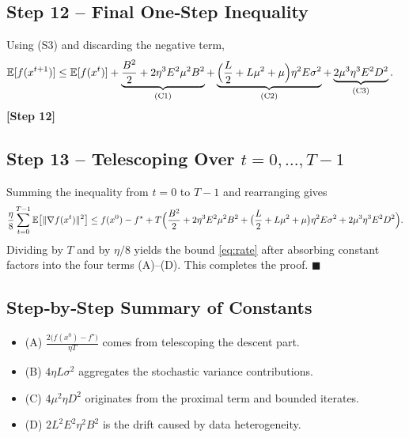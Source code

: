 \documentclass{article}
\begin{document}
\subsection*{Step 12 – Final One‑Step Inequality}
Using (S3) and discarding the negative term,
\begin{align}
\mathbb{E}[f(x^{t+1})]
&\le \mathbb{E}[f(x^{t})]
   +\underbrace{\frac{B^{2}}{2}+2\eta^{3}E^{2}\mu^{2}B^{2}}_{\text{(C1)}}
   +\underbrace{\Bigl(\frac{L}{2}+L\mu^{2}+\mu\Bigr)\eta^{2}E\sigma^{2}}_{\text{(C2)}}
   +\underbrace{2\mu^{3}\eta^{3}E^{2}D^{2}}_{\text{(C3)}} .
\end{align}
\textbf{[Step 12]}

\subsection*{Step 13 – Telescoping Over $t=0,\dots,T-1$}
Summing the inequality from $t=0$ to $T-1$ and rearranging gives
\[
\frac{\eta}{8}\sum_{t=0}^{T-1}\mathbb{E}\bigl[\|\nabla f(x^{t})\|^{2}\bigr]
\le f(x^{0})-f^{\star}
   +T\Bigl(\frac{B^{2}}{2}+2\eta^{3}E^{2}\mu^{2}B^{2}
           +\bigl(\frac{L}{2}+L\mu^{2}+\mu\bigr)\eta^{2}E\sigma^{2}
           +2\mu^{3}\eta^{3}E^{2}D^{2}\Bigr).
\]
Dividing by $T$ and by $\eta/8$ yields the bound \eqref{eq:rate} after absorbing constant factors into the four terms (A)–(D).  This completes the proof. \hfill $\blacksquare$

\subsection*{Step‑by‑Step Summary of Constants}
\begin{itemize}
    \item (A) $ \displaystyle \frac{2\bigl(f(x^{0})-f^{\star}\bigr)}{\eta T}$ comes from telescoping the descent part.
    \item (B) $4\eta L\sigma^{2}$ aggregates the stochastic variance contributions.
    \item (C) $4\mu^{2}\eta D^{2}$ originates from the proximal term and bounded iterates.
    \item (D) $2L^{2}E^{2}\eta^{2}B^{2}$ is the drift caused by data heterogeneity.
\end{itemize}

\end{document}
